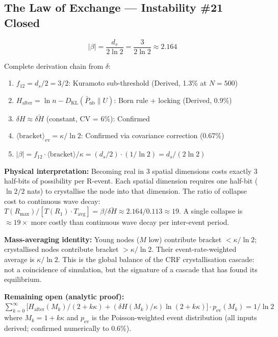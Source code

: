 \documentclass[12pt, a4paper]{article}
\begin{document}
\subsection{The Law of Exchange --- Instability \#21 Closed}

\begin{keybox}[title={Law of Exchange: $|\beta| = d_s/(2\ln 2)$ --- Closed}]
\[
  \boxed{|\beta| = \frac{d_s}{2\ln 2} = \frac{3}{2\ln 2} \approx 2.164}
\]

Complete derivation chain from $\delta$:
\begin{enumerate}
\item $f_{12} = d_s/2 = 3/2$: Kuramoto sub-threshold (Derived, 1.3\% at $N=500$)
\item $H_{\mathrm{after}} = \ln n - D_{\mathrm{KL}}(\bar{P}_{\mathrm{nb}}\|U)$: Born rule + locking (Derived, 0.9\%)
\item $\delta H \approx \bar{\delta H}$ (constant, CV = 6\%): Confirmed
\item $\langle\mathrm{bracket}\rangle_{\mathrm{ev}} = \kappa/\ln 2$: Confirmed via covariance correction (0.67\%)
\item $|\beta| = f_{12}\cdot\langle\mathrm{bracket}\rangle/\kappa = (d_s/2)\cdot(1/\ln 2) = d_s/(2\ln 2)$
\end{enumerate}

\textbf{Physical interpretation:} Becoming real in 3 spatial dimensions costs exactly
3 half-bits of possibility per R-event. Each spatial dimension requires one half-bit
($\ln 2/2$ nats) to crystallise the node into that dimension.
The ratio of collapse cost to continuous wave decay: $T(R_{\max})/[T(R_1)\cdot T_{\mathrm{avg}}]
= \beta/\bar{\delta H} \approx 2.164/0.113 \approx 19$. A single collapse is $\approx 19\times$
more costly than continuous wave decay per inter-event period.

\textbf{Mass-averaging identity:} Young nodes ($M$ low) contribute bracket $< \kappa/\ln 2$;
crystallised nodes contribute bracket $> \kappa/\ln 2$. Their event-rate-weighted average is
$\kappa/\ln 2$. This is the global balance of the CRF crystallisation cascade: not a coincidence
of simulation, but the signature of a cascade that has found its equilibrium.

\textbf{Remaining open (analytic proof):}
$\sum_{k=0}^{\infty}\bigl[H_{\mathrm{after}}(M_k)/(2+k\kappa)
+ (\delta H(M_k)/\kappa)\ln(2+k\kappa)\bigr]\cdot p_{\mathrm{ev}}(M_k) = 1/\ln 2$
where $M_k = 1 + k\kappa$ and $p_{\mathrm{ev}}$ is the Poisson-weighted event distribution
(all inputs derived; confirmed numerically to 0.6\%).
\end{keybox}
\end{document}
